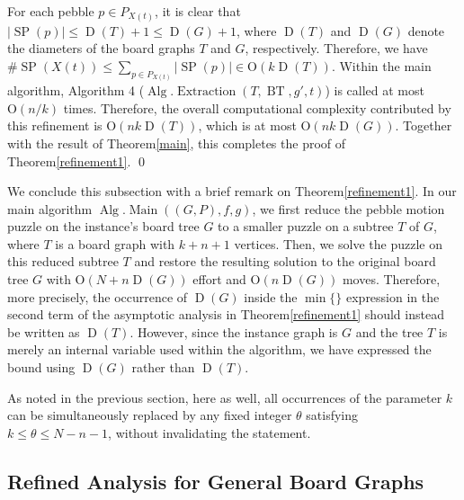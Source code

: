 \documentclass[letter,11pt]{article}
\theoremstyle{definition}
\theoremstyle{definition}
\DeclareMathOperator{\BT}{BT}
\DeclareMathOperator{\Alg}{Alg}
\DeclareMathOperator{\Extraction}{Extraction}
\DeclareMathOperator{\Main}{Main}
\DeclareMathOperator{\SP}{SP}
\DeclareMathOperator{\D}{D}
\newcommand{\1}{\boldmath$~1~$\unboldmath}
\newcommand{\Ord}{\mathrm{O}}
\newcommand{\tume}{\hspace*{0.2em}}
\begin{document}
For each pebble $p \in P_{X(t)}$, it is clear that $|\SP(p)| \leq \D(T)+1 \leq \D(G)+1$, where 
$\D(T)$ and $\D(G)$ denote the diameters of the board graphs $T$ and $G$, respectively.
Therefore, we have $\#\SP(X(t)) \leq \sum_{p\in P_{X(t)}} |\SP(p)| \in \Ord(k \D(T))$.
Within the main algorithm, Algorithm 4 ($\Alg.\Extraction(T, \BT, g', t)$) is called at most $\Ord(n / k)$ times.
Therefore, the overall computational complexity contributed by this refinement is $\Ord(n k \D(T))$, which is 
at most $\Ord(n k \D(G))$.
Together with the result of Theorem\tume\ref{main}, this completes the proof of Theorem\tume\ref{refinement1}. \qed

We conclude this subsection with a brief remark on Theorem\tume\ref{refinement1}.
In our main algorithm $\Alg.\Main((G,P), f, g)$, we first reduce the pebble motion puzzle on 
the instance's board tree $G$ to a smaller puzzle on a subtree $T$ of $G$, where $T$ is 
a board graph with $k+n+1$ vertices. 
Then, we solve the puzzle on this reduced subtree $T$ and restore the resulting solution to 
the original board tree $G$ with $\Ord(N+n\D(G))$ effort and $\Ord(n\D(G))$ moves. 
Therefore, more precisely, the occurrence of $\D(G)$ inside the $\min\{\}$ expression 
in the second term of the asymptotic analysis in Theorem\tume\ref{refinement1} should 
instead be written as $\D(T)$.
However, since the instance graph is $G$ and the tree $T$ is merely an internal variable used 
within the algorithm, we have expressed the bound using $\D(G)$ rather than $\D(T)$.

As noted in the previous section, here as well, all occurrences of the parameter $k$ can be 
simultaneously replaced by any fixed integer $\theta$ satisfying $k \leq \theta \leq N - n - 1$, 
without invalidating the statement.


\subsection{Refined Analysis for General Board Graphs}\label{refinement-general}
\end{document}
